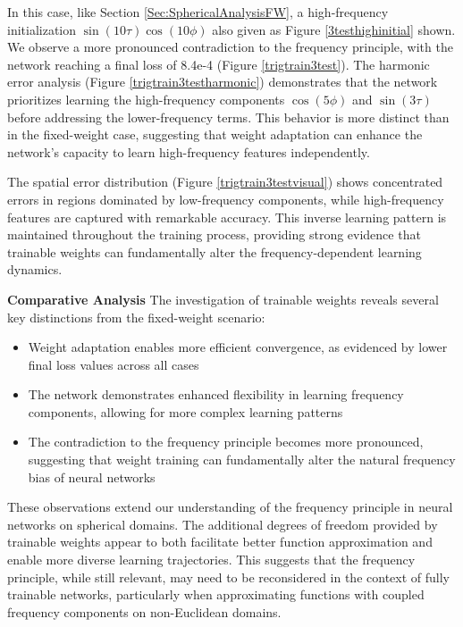 \documentclass[review,onefignum,onetabnum,onealgnum]{siamart250106}
\numberwithin{theorem}{section}
\begin{document}
In this case, like Section \ref{Sec:SphericalAnalysisFW}, a high-frequency initialization $\sin(10\tau)\cos(10\phi)$ also given as Figure \ref{3testhighinitial} shown. We observe a more pronounced contradiction to the frequency principle, with the network reaching a final loss of 8.4e-4 (Figure \ref{trigtrain3test}). The harmonic error analysis (Figure \ref{trigtrain3testharmonic}) demonstrates that the network prioritizes learning the high-frequency components $\cos(5\phi)$ and $\sin(3\tau)$ before addressing the lower-frequency terms. This behavior is more distinct than in the fixed-weight case, suggesting that weight adaptation can enhance the network's capacity to learn high-frequency features independently.

The spatial error distribution (Figure \ref{trigtrain3testvisual}) shows concentrated errors in regions dominated by low-frequency components, while high-frequency features are captured with remarkable accuracy. This inverse learning pattern is maintained throughout the training process, providing strong evidence that trainable weights can fundamentally alter the frequency-dependent learning dynamics.

\textbf{Comparative Analysis}
The investigation of trainable weights reveals several key distinctions from the fixed-weight scenario:
\begin{itemize}
    \item Weight adaptation enables more efficient convergence, as evidenced by lower final loss values across all cases
    \item The network demonstrates enhanced flexibility in learning frequency components, allowing for more complex learning patterns
    \item The contradiction to the frequency principle becomes more pronounced, suggesting that weight training can fundamentally alter the natural frequency bias of neural networks
\end{itemize}

These observations extend our understanding of the frequency principle in neural networks on spherical domains. The additional degrees of freedom provided by trainable weights appear to both facilitate better function approximation and enable more diverse learning trajectories. This suggests that the frequency principle, while still relevant, may need to be reconsidered in the context of fully trainable networks, particularly when approximating functions with coupled frequency components on non-Euclidean domains.
\end{document}
